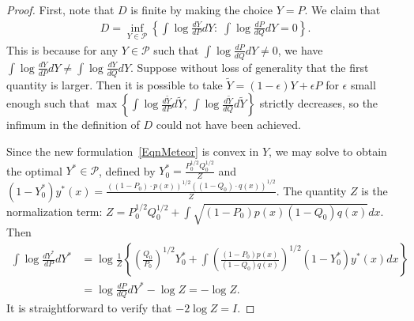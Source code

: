 \documentclass{article}
\begin{document}
\begin{proof} 
First, note that $D$ is finite by making the choice $Y = P$. We claim that
\begin{align}
\label{EqnMeteor}
D = \inf_{Y \in \mathcal{P}} \left\{\int \log \frac{dY}{dP} dY: \; \int \log \frac{dP}{dQ} dY = 0\right\}.
\end{align}
This is because for any $Y \in \mathcal{P}$ such that $\int \log \frac{dP}{dQ} dY \neq 0$, 
we have $\int \log \frac{dY}{dP} dY \neq \int \log \frac{dY}{dQ} dY$. 
Suppose without loss of generality that the first quantity is larger. Then it is possible to take $\tilde{Y} = (1 - \epsilon) Y + \epsilon P$ for $\epsilon$ small enough such that $ \max \left\{ \int \log \frac{d\tilde{Y}}{dP} d\tilde{Y}, \, \int \log \frac{d\tilde{Y}}{dQ} d\tilde{Y} \right\}$ strictly decreases, so the infimum in the definition of $D$ could not have been achieved.

Since the new formulation~\eqref{EqnMeteor} is convex in $Y$, we may solve to obtain the optimal $Y^* \in \mathcal{P}$, defined by $Y_0^* = \frac{P_0^{1/2} Q_0^{1/2}}{Z}$ and $(1-Y_0^*) y^*(x) = \frac{((1-P_0) \cdot p(x))^{1/2} ((1-Q_0) \cdot q(x))^{1/2}}{Z}$. The quantity $Z$ is the normalization term: $Z = P_0^{1/2} Q_0^{1/2} + \int \sqrt{ (1-P_0) p(x) (1-Q_0) q(x)} dx$. 
Then
\begin{align*}
\int \log \frac{dY^*}{dP} dY^*  &= \log \frac{1}{Z} \left\{ 
           \left( \frac{Q_0}{P_0} \right)^{1/2}  Y_0^* + \int \left(\frac{(1-P_0) p(x)}{(1-Q_0)q(x)} \right)^{1/2} (1-Y_0^*) y^*(x) dx \right\} \\
  &= \log \frac{dP}{dQ} dY^* - \log Z = - \log Z. 
\end{align*}
It is straightforward to verify that $-2 \log Z = I$. 
\end{proof}
\end{document}
